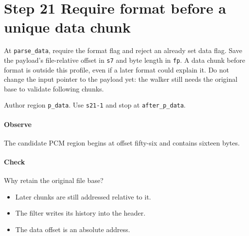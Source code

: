 \section{Step 21 Require format before a unique data chunk}\label{pcm-wav-s21}
At \texttt{parse\_data}, require the format flag and reject an already set data flag. Save the payload's file-relative offset in \texttt{s7} and byte length in \texttt{fp}. A data chunk before format is outside this profile, even if a later format could explain it. Do not change the input pointer to the payload yet: the walker still needs the original base to validate following chunks.

Author region \texttt{p\_data}. Use \texttt{s21-1} and stop at \texttt{after\_p\_data}.

\paragraph{Observe} The candidate PCM region begins at offset fifty-six and contains sixteen bytes.

\paragraph{Check} Why retain the original file base?
\begin{itemize}
  \item[A.] Later chunks are still addressed relative to it.
  \item[B.] The filter writes its history into the header.
  \item[C.] The data offset is an absolute address.
\end{itemize}
